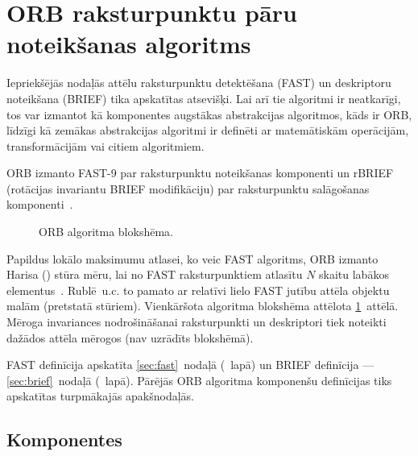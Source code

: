\section{ORB raksturpunktu pāru noteikšanas algoritms}\label{sec:orb}
Iepriekšējās nodaļās attēlu raksturpunktu detektēšana (FAST) un
deskriptoru noteikšana (BRIEF) tika apskatītas atsevišķi. Lai arī tie
algoritmi ir neatkarīgi, tos
var izmantot kā komponentes augstākas abstrakcijas algoritmos, kāds ir ORB,
līdzīgi kā zemākas abstrakcijas algoritmi ir
definēti ar matemātiskām operācijām, transformācijām vai citiem algoritmiem.

ORB izmanto FAST-9 par raksturpunktu noteikšanas komponenti
 un rBRIEF 
(rotācijas invariantu BRIEF modifikāciju) par raksturpunktu salāgošanas
komponenti~\cite{ORB}.
\begin{figure}[tbh]
	\centering
	\def\svgwidth{\linewidth}
	{\small}
	\caption{ORB algoritma blokshēma.}
	\label{fig:orb-sheem}
\end{figure}
Papildus lokālo maksimumu atlasei, ko veic FAST algoritms, ORB izmanto
Harisa () stūra mēru, lai no FAST raksturpunktiem atlasītu
$N$ skaitu labākos elementus~\cite{ORB}.
Rublē~u.c.\cite{ORB} to pamato ar relatīvi lielo FAST jutību attēla
objektu malām (pretstatā stūriem). Vienkāršota algoritma blokshēma attēlota
\ref{fig:orb-sheem}~attēlā. Mēroga invariances nodrošināšanai raksturpunkti
un deskriptori tiek noteikti dažādos attēla mērogos (nav uzrādīts blokshēmā).

FAST definīcija apskatīta \ref{sec:fast}~nodaļā
(\pageref{sec:fast}~lapā) un BRIEF definīcija --- \ref{sec:brief}~nodaļā
(\pageref{sec:brief}~lapā). Pārējās ORB algoritma komponenšu definīcijas
tiks apskatītas turpmākajās apakšnodaļās.

\subsection{Komponentes}











